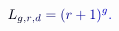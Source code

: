 \documentclass[12pt]{article}
\begin{document}
\makeatletter
\renewcommand*{\@textcolor}[3]{%
  \protect\leavevmode
  \begingroup
    \color#1{#2}#3%
  \endgroup
}
\makeatother
\begin{displaymath}
\mathcolor[RGB]{0,0,15}{L} _ { \mathcolor[RGB]{0,0,30}{g} \mathcolor[RGB]{0,0,45}{,} \mathcolor[RGB]{0,0,60}{r} \mathcolor[RGB]{0,0,75}{,} \mathcolor[RGB]{0,0,90}{d} } \mathcolor[RGB]{0,0,105}{=} \mathcolor[RGB]{0,0,120}{(} \mathcolor[RGB]{0,0,135}{r} \mathcolor[RGB]{0,0,150}{+} \mathcolor[RGB]{0,0,165}{1} \mathcolor[RGB]{0,0,180}{)} ^ { \mathcolor[RGB]{0,0,195}{g} } \mathcolor[RGB]{0,0,210}{.}
\end{displaymath}
\end{document}
